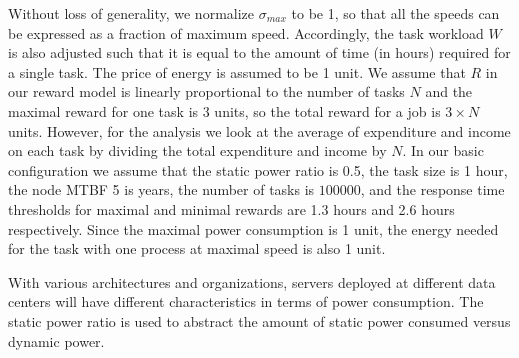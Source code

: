 Without loss of generality, we normalize $\sigma_{max}$ to be 1, so
that all the speeds can be expressed as a fraction of maximum
speed. Accordingly, the task workload $W$ is also adjusted such that
it is equal to the amount of time (in hours) required for a single
task. %
The price of
energy is assumed to be 1 unit. We assume that $R$ in our reward model
is linearly proportional to the number of tasks $N$ and the maximal
reward for one task is 3 units, so the total reward for a job is $3
\times N$ units.  However, for the analysis we look
at the average of expenditure and income on each task by dividing the
total expenditure and income by $N$. In our basic configuration we
assume that the static power ratio is 0.5, the task size is 1 hour, the node MTBF 5 is
years, the number of tasks is $100000$, and the response time thresholds for
maximal and minimal rewards are 1.3 hours and 2.6 hours
respectively. Since the maximal power consumption is 1 unit, the
energy needed for the task with one process at maximal speed is also 1
unit. 


With various architectures and organizations, servers deployed at
different data centers will have different characteristics in terms of
power consumption. The static power ratio is used to abstract the
amount of static power consumed versus dynamic power.  


